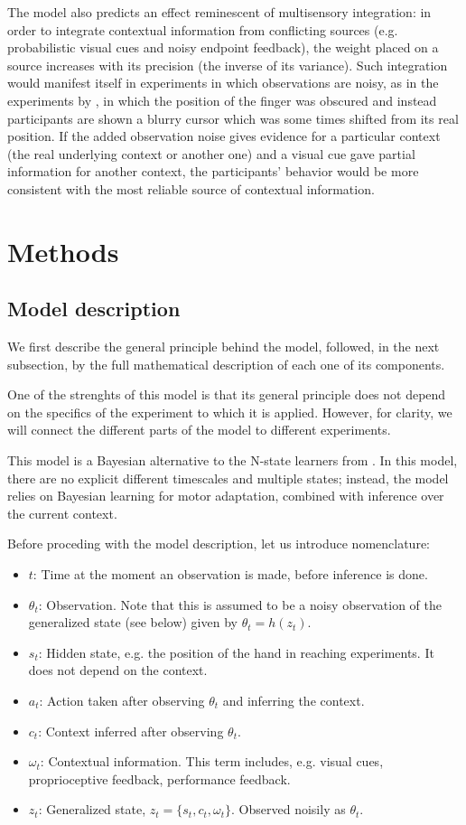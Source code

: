 \documentclass[a4paper,doc,floatsintext,natbib]{apa6}
\begin{document}
The model also predicts an effect reminescent of multisensory integration: in order to integrate contextual information from conflicting sources (e.g. probabilistic visual cues and noisy endpoint feedback), the weight placed on a source increases with its precision (the inverse of its variance). Such integration would manifest itself in experiments in which observations are noisy, as in the experiments by \cite{Kording_Bayesian_2004}, in which the position of the finger was obscured and instead participants are shown a blurry cursor which was some times shifted from its real position. If the added observation noise gives evidence for a particular context (the real underlying context or another one) and a visual cue gave partial information for another context, the participants' behavior would be more consistent with the most reliable source of contextual information.



\section{Methods}
\subsection{Model description}
\label{subsection:model-description}
We first describe the general principle behind the model, followed, in the next
subsection, by the full mathematical description of each one of its components.

One of the strenghts of this model is that its general principle does not
depend on the specifics of the experiment to which it is applied. However, for
clarity, we will connect the different parts of the model to different
experiments.

This model is a Bayesian alternative to the N-state learners from
\citep[e.g.][]{Lee_Dual_2009}. In this model, there are no explicit different
timescales and multiple states; instead, the model relies on Bayesian learning
for motor adaptation, combined with inference over the current context.

Before proceding with the model description, let us introduce nomenclature:
\begin{itemize}
\item $t$: Time at the moment an observation is made, before inference is done.
\item $\theta_t$: Observation. Note that this is assumed to be a noisy
observation of the generalized state (see below) given by $\theta_t = h(z_t)$.
\item $s_t$: Hidden state, e.g. the position of the hand in reaching
experiments. It does not depend on the context.
\item $a_t$: Action taken after observing $\theta_t$ and inferring the context.
\item $c_t$: Context inferred after observing $\theta_t$.
\item $\omega_t$: Contextual information. This term includes, e.g. visual cues,
proprioceptive feedback, performance feedback.
\item $z_t$: Generalized state, $z_t = \{s_t, c_t, \omega_t\}$. Observed noisily
as $\theta_t$.
\end{itemize}
\end{document}
